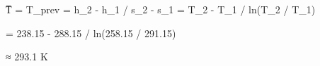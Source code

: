 T̅ = T_prev = h_2 - h_1 / s_2 - s_1 = T_2 - T_1 / ln(T_2 / T_1)  

= 238.15 - 288.15 / ln(258.15 / 291.15)  

≈ 293.1 K
